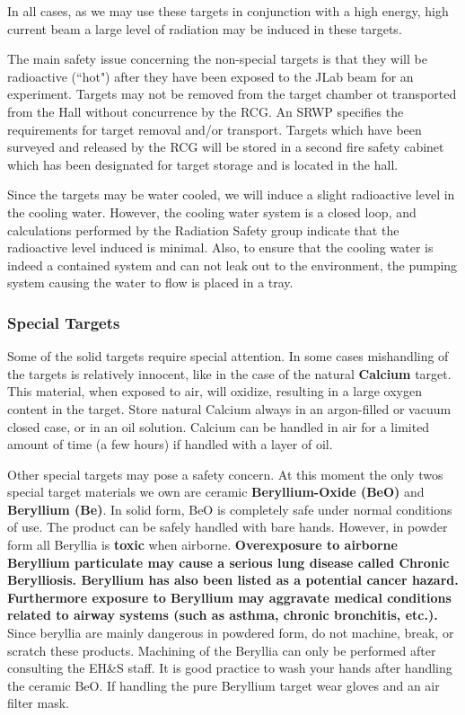 In all cases, as we may use these targets in conjunction with a high
energy, high current beam a large level of radiation may be induced
in these targets.

The main safety issue concerning the non-special targets is that
they will be radioactive (``hot") after they have been
exposed to the JLab beam for an experiment.
Targets may not be removed from the target chamber ot transported from the Hall without 
concurrence by the RCG. An SRWP specifies the requirements for target removal and/or 
transport. Targets which have been surveyed and released by the RCG will be stored in a 
second fire safety cabinet which has been designated for target storage and is located in 
the hall.

Since the targets may be water cooled, we will induce a slight
radioactive level in the cooling water. However, the cooling water
system is a closed loop, and calculations performed by the Radiation
Safety group indicate that the radioactive level induced is minimal.
Also, to ensure that the cooling water is indeed a contained system
and can not leak out to the environment, the pumping system causing
the water to flow is placed in a tray.

\subsubsection{Special Targets}

Some of the solid targets require special attention. In some cases
mishandling of the targets is relatively innocent, like in the case
of the natural {\bf Calcium} target. This material, when exposed to air,
will oxidize, resulting in a large oxygen content in the target.
Store natural Calcium always in an argon-filled or vacuum closed
case, or in an oil solution. Calcium can be handled in air for a limited
amount of time (a few hours) if handled with a layer of oil.

Other special targets may pose a safety concern. At this
moment the only twos special target materials we own are ceramic
{\bf Beryllium-Oxide (BeO)} and {\bf Beryllium (Be)}.
In solid form, BeO is completely safe under normal conditions of use.
The product can be safely handled with bare hands.
However, in powder form all Beryllia is {\bf toxic} when airborne.
{\bf Overexposure to airborne Beryllium particulate may cause a
serious lung disease called Chronic Berylliosis. Beryllium has also
been listed as a potential cancer hazard. Furthermore exposure to
Beryllium may aggravate medical conditions related to airway systems
(such as asthma, chronic bronchitis, etc.).}
Since beryllia are mainly dangerous in powdered form, do not machine,
break, or scratch these products. Machining of the Beryllia can only
be performed after consulting the EH\&S staff.
It is good practice to wash your
hands after handling the ceramic BeO. If handling the pure Beryllium
target wear gloves and an air filter mask.


